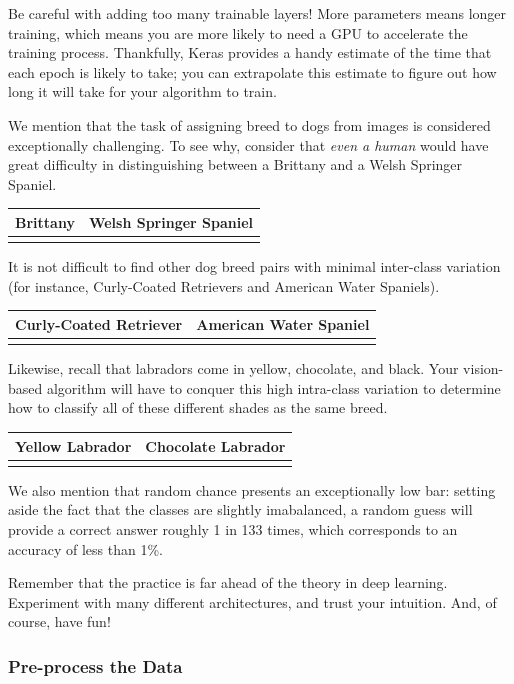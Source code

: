 \documentclass[11pt]{article}
\begin{document}
Be careful with adding too many trainable layers! More parameters means
longer training, which means you are more likely to need a GPU to
accelerate the training process. Thankfully, Keras provides a handy
estimate of the time that each epoch is likely to take; you can
extrapolate this estimate to figure out how long it will take for your
algorithm to train.

We mention that the task of assigning breed to dogs from images is
considered exceptionally challenging. To see why, consider that
\emph{even a human} would have great difficulty in distinguishing
between a Brittany and a Welsh Springer Spaniel.

\begin{longtable}[]{@{}ll@{}}
\toprule
Brittany & Welsh Springer Spaniel\tabularnewline
\midrule
\endhead
&\tabularnewline
\bottomrule
\end{longtable}

It is not difficult to find other dog breed pairs with minimal
inter-class variation (for instance, Curly-Coated Retrievers and
American Water Spaniels).

\begin{longtable}[]{@{}ll@{}}
\toprule
Curly-Coated Retriever & American Water Spaniel\tabularnewline
\midrule
\endhead
&\tabularnewline
\bottomrule
\end{longtable}

Likewise, recall that labradors come in yellow, chocolate, and black.
Your vision-based algorithm will have to conquer this high intra-class
variation to determine how to classify all of these different shades as
the same breed.

\begin{longtable}[]{@{}ll@{}}
\toprule
Yellow Labrador & Chocolate Labrador\tabularnewline
\midrule
\endhead
&\tabularnewline
\bottomrule
\end{longtable}

We also mention that random chance presents an exceptionally low bar:
setting aside the fact that the classes are slightly imabalanced, a
random guess will provide a correct answer roughly 1 in 133 times, which
corresponds to an accuracy of less than 1\%.

Remember that the practice is far ahead of the theory in deep learning.
Experiment with many different architectures, and trust your intuition.
And, of course, have fun!

\subsubsection{Pre-process the Data}\label{pre-process-the-data}
\end{document}
